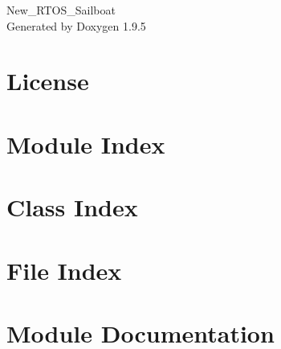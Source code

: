 \documentclass[twoside]{book}
\newcommand{\+}{\discretionary{\mbox{\scriptsize$\hookleftarrow$}}{}{}}
\newcommand{\clearemptydoublepage}{%
    \newpage{\pagestyle{empty}\cleardoublepage}%
  }
\begin{document}
  \raggedbottom
    \hypersetup{pageanchor=false,
                bookmarksnumbered=true,
                pdfencoding=unicode
               }
  \begin{titlepage}
  \vspace*{7cm}
  \begin{center}%
  {\Large New\+\_\+\+RTOS\+\_\+\+Sailboat}\\
  \vspace*{1cm}
  {\large Generated by Doxygen 1.9.5}\\
  \end{center}
  \end{titlepage}
  \clearemptydoublepage
  \tableofcontents
  \clearemptydoublepage
  \hypersetup{pageanchor=true}
\chapter{License}
\label{_license}

\chapter{Module Index}

\chapter{Class Index}

\chapter{File Index}

\chapter{Module Documentation}


\end{document}
